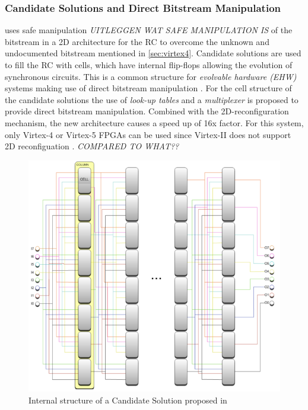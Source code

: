\subsubsection{Candidate Solutions and Direct Bitstream Manipulation}
\label{sec:candidate}
\cite{virtex4} uses safe manipulation \emph{UITLEGGEN WAT SAFE MANIPULATION IS} of the bitstream in a 2D architecture for the RC to overcome the unknown and undocumented bitstream mentioned in \ref{sec:virtex4}. Candidate solutions are used to fill the RC with cells, which have internal flip-flops allowing the evolution of synchronous circuits. This is a common structure for \emph{evolvable hardware (EHW)} systems making use of direct bitstream manipulation \cite{virtex4}. For the cell structure of the candidate solutions the use of \emph{look-up tables} and a \emph{multiplexer} is proposed to provide direct bitstream manipulation. Combined with the 2D-reconfiguration mechanism, the new architecture causes a speed up of 16x factor. For this system, only Virtex-4 or Virtex-5 FPGAs can be used since Virtex-II does not support 2D reconfiguation \cite{virtex4}. \emph{COMPARED TO WHAT??}

\begin{figure}[htb]%
\includegraphics[width=\columnwidth]{Pictures/candidate.png}%
\caption{Internal structure of a Candidate Solution proposed in \cite{virtex4}}%
\label{fig:candidate}%
\end{figure}

